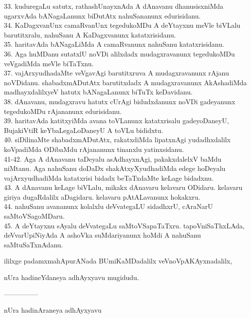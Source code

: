 \documentclass{article}
\begin{document}
33. kuduregaLu satutx, rathashUnayxnAda A dAnavanu dhanusisxniMda ugarxvAda bANagaLanunx biDutAtx nahuSananunx edurisidanu.\\
34. KaDagxvanUnx camaRvanUnx tegedukoMDu A deYtayxnu meVle biVLalu barutitxralu, nahuSanu A KaDagxvanunx katatxrisidanu.\\
35. haritavAda bANagaLiMda A camaRvanunx nahuSanu katatxrisidanu.\\
36. Aga huMDanu sutatxlU noVDi alilxdadx mudagxravanunx tegedukoMDu veVgadiMda meVle biTaTxnu.\\
37. vajArxyudhadaMte veVgavAgi barutitxruva A mudagxravanunx rAjanu noVDidanu. shabadxmADutAtx barutitxdadx A mudagxravanunx AkAshadiMda madhayxdalilxyeV hatutx bANagaLanunx biTuTx keDavidanu.\\
38. dAnavanu, mudagxravu hatutx cUrAgi bidudxdanunx noVDi gadeyanunx tegedukoMDu rAjananunx edurisidanu.\\
39. haritavAda katitxyiMda avana toVLanunx katatxrisalu gadeyoDaneyU, BujakiVtiR keYbaLegaLoDaneyU A toVLu bididxtu.\\
40. siDilinaMte shabadxmADutAtx, rakatxdiMda lipatxnAgi yudadhxdalilx koVpadiMda ODibaMdu rAjananunx tinanxlu yatinxsidanu.\\
41-42. Aga A dAnavanu taDeyalu asAdhayxnAgi, pakakxdalelxV baMdu niMtanu. Aga nahuSanu doDaDx shakAtxyXyudhadiMda edege hoDeyalu vajArxyudhadiMda katatxrisi bidadx beTaTxdaMte keLage bidadxnu.\\
43. A dAnavanu keLage biVLalu, mikakx dAnavaru kelavaru ODidaru. kelavaru giriya dugaRdalilx aDagidaru. kelavaru pAtALavanunx hokakxru.\\
44. nahuSanu avananunx kolalxlu deVvategaLU sidadhxrU, cAraNarU saMtoVSagoMDaru.\\
45. A deYtayxnu sAyalu deVvategaLu saMtoVSapaTaTxru. tapoVniSaThxLAda, deVvarUpiNiyAda A ashoVka suMdariyanunx hoMdi A nahuSanu saMtuSaTxnAdanu.

\begin{center}
ililxge padamxmahApurANada BUmiKaMDadalilx veVnoVpAKAyxnadalilx,
\end{center}

\begin{center}
nUra hadineYdaneya adhAyxyavu mugidudu.
\end{center}

\begin{center}
---------------
\end{center}

\begin{center}
nUra hadinAraneya adhAyxyavu
\end{center}
\end{document}
